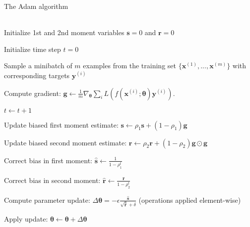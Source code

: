 \begin{algorithm}
\caption{The Adam algorithm}\label{alg:Adam}
\begin{algorithmic}
    \Require{Exponential decay rates for momentum estimates, $\rho_1$ and
    $\rho_2$ in $[0,1)$. (Suggested defaults: 0.9 and 0.999 respectively)}
    \\
    Initialize 1st and 2nd moment variables $\boldsymbol{s}=0$ and
    $\boldsymbol{r}=0$

    Initialize time step $t=0$


        Sample a minibatch of $m$ examples from the training set
        $\{\boldsymbol{x}^{(1)}, ..., \boldsymbol{x}^{(m)}\}$ with corresponding
        targets $\boldsymbol{y}^{(i)}$
        
        Compute gradient: $\boldsymbol{g} \gets
        \frac{1}{m}\nabla_{\boldsymbol\theta}
        \sum_{i}L(f(\boldsymbol{x}^{(i)};\boldsymbol{\theta})\boldsymbol{y}^{(i)})$.
        
        $t\gets t+1$

        Update biased first moment estimate: $\boldsymbol{s}\gets
        \rho_1\boldsymbol{s} + (1-\rho_1)\boldsymbol{g}$

        Update biased second moment estimate: $\boldsymbol{r}\gets
        \rho_2\boldsymbol{r} + (1-\rho_2)\boldsymbol{g}\odot\boldsymbol{g}$

        Correct bias in first moment: $\hat{\boldsymbol{s}}\gets
        \frac{1}{1-\rho_1^t}$

        Correct bias in second moment: $\hat{\boldsymbol{r}}\gets
        \frac{\boldsymbol{r}}{1-\rho_2^t}$

        Compute parameter update: $\Delta\boldsymbol\theta =
        -\epsilon\frac{\hat{\boldsymbol{s}}}{\sqrt{\hat{\boldsymbol{r}}}+\delta}$
        (operations applied element-wise)

        Apply update: $\boldsymbol\theta\gets \boldsymbol\theta +
        \Delta\boldsymbol\theta$
    \EndWhile
\end{algorithmic}
\end{algorithm}
